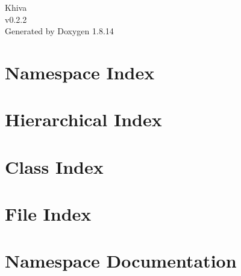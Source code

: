 \documentclass[twoside]{book}
\newcommand{\+}{\discretionary{\mbox{\scriptsize$\hookleftarrow$}}{}{}}
\newcommand{\clearemptydoublepage}{%
  \newpage{\pagestyle{empty}\cleardoublepage}%
}
\begin{document}
\hypersetup{pageanchor=false,
             bookmarksnumbered=true,
             pdfencoding=unicode
            }
\begin{titlepage}
\vspace*{7cm}
\begin{center}%
{\Large Khiva \\[1ex]\large v0.\+2.\+2 }\\
\vspace*{1cm}
{\large Generated by Doxygen 1.8.14}\\
\end{center}
\end{titlepage}
\clearemptydoublepage
{}
\tableofcontents
\clearemptydoublepage
{}
\hypersetup{pageanchor=true}

\chapter{Namespace Index}

\chapter{Hierarchical Index}

\chapter{Class Index}

\chapter{File Index}

\chapter{Namespace Documentation}






























\end{document}
